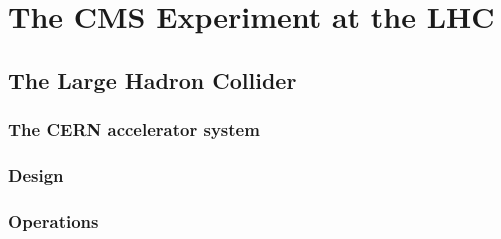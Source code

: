 \chapter{The CMS Experiment at the LHC}

\section{The Large Hadron Collider}
\subsection{The CERN accelerator system}
\subsection{Design}
\subsection{Operations}



